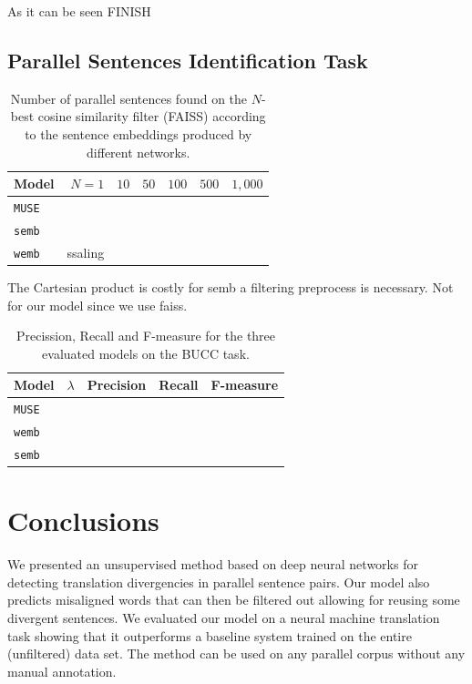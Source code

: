 \documentclass[11pt,a4paper]{article}
\begin{document}
As it can be seen FINISH

\subsection{Parallel Sentences Identification Task}

\begin{table}[h]
\small
\center
\begin{tabular}{lrccccc}
\hline
\bf Model & $N=1$ & $10$ & $50$ & $100$ & $500$ & $1,000$ \\
\hline
\texttt{MUSE}           & & & & & & \\
\texttt{semb}            & & & & & & \\
\texttt{wemb}           & ssaling & & & & & \\
\hline
\end{tabular}
\caption{Number of parallel sentences found on the $N$-best cosine similarity filter (FAISS) according to the sentence embeddings produced by different networks.}
\label{results_embeddings}
\end{table}

The Cartesian product is costly for semb a filtering preprocess is necessary. Not for our model since we use faiss.

\begin{table}[h]
\small
\center
\begin{tabular}{lcccc}
\hline
\bf Model  & $\lambda$ & Precision & Recall & F-measure \\
\hline
\texttt{MUSE}             & & & & \\
\texttt{wemb}             & & & & \\
\texttt{semb}              & & & & \\
\hline
\end{tabular}
\caption{Precission, Recall and F-measure for the three evaluated models on the BUCC task.}
\label{results_similarity}
\end{table}

\section{Conclusions}
\label{conclusions}

We presented an unsupervised method based on deep neural networks for detecting translation divergencies in parallel sentence pairs. Our model also predicts misaligned words that can then be filtered out allowing for reusing some divergent sentences.
We evaluated our model on a neural machine translation task showing that it outperforms a baseline system trained on the entire (unfiltered) data set. The method can be used on any parallel corpus without any manual annotation.
\end{document}
